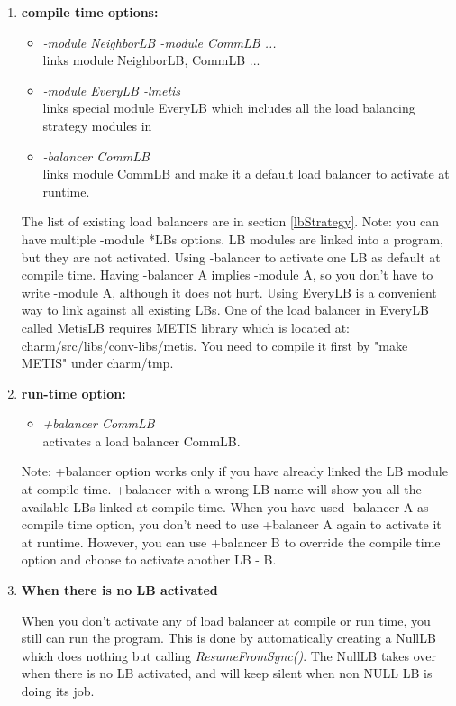 \begin{enumerate}
\item {\bf compile time options:}

\begin{itemize}
\item {\em -module NeighborLB -module CommLB ...}  \\
  links module NeighborLB, CommLB ...
\item {\em -module EveryLB -lmetis} \\
  links special module EveryLB which includes all the load balancing strategy modules in \charmpp{}
\item {\em -balancer CommLB} \\
  links module CommLB and make it a default load balancer to activate at runtime.
\end{itemize}

The list of existing load balancers are in section \ref{lbStrategy}.
Note: you can have multiple -module *LBs options. LB modules are
linked into a program, but they are not activated.
Using -balancer to activate one LB as default at compile time. Having -balancer A implies -module A, so you don't have to write -module A, although it does
not hurt.
Using EveryLB is a convenient way to link against all existing LBs. 
One of the load balancer in EveryLB called MetisLB requires METIS library 
which is located at: charm/src/libs/conv-libs/metis. 
You need to compile it first by "make METIS" under charm/tmp.

\item {\bf run-time option:}

\begin{itemize}
\item {\em +balancer CommLB} \\
  activates a load balancer CommLB.
\end{itemize}

Note: +balancer option works only if you have already linked the LB module 
at compile time. +balancer with a 
wrong LB name will show you all the available LBs linked at compile time.
When you have used -balancer A as compile time option, you don't need to use 
+balancer A again to activate it at runtime. However, you can 
use +balancer B to override the compile time option and choose to
activate another LB - B.

\item {\bf When there is no LB activated}

When you don't activate any of load balancer at compile or run time, you still 
can run the program. This is done by automatically creating a NullLB which 
does nothing but calling {\em ResumeFromSync()}. 
The NullLB takes over when there is no LB activated, and will keep silent 
when non NULL LB is doing its job. 

\end{enumerate}

